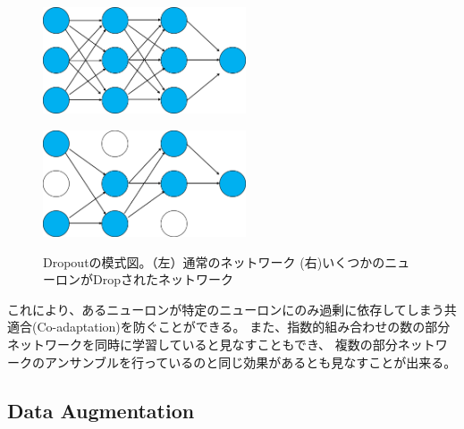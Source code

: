 
\begin{figure}[tbp]
    \begin{minipage}{0.5\hsize}
     \begin{center}
      \includegraphics[width=60mm]{figures/standard_network.png}
     \end{center}
     \label{fig:one}
    \end{minipage}
    \begin{minipage}{0.5\hsize}
     \begin{center}
      \includegraphics[width=60mm]{figures/dropout_network.png}
     \end{center}
     \label{fig:two}
    \end{minipage}
    \caption{\label{fig:dropout_network}Dropoutの模式図。（左）通常のネットワーク (右)いくつかのニューロンがDropされたネットワーク}
    
\end{figure}

これにより、あるニューロンが特定のニューロンにのみ過剰に依存してしまう共適合(Co-adaptation)を防ぐことができる。
また、指数的組み合わせの数の部分ネットワークを同時に学習していると見なすこともでき、
複数の部分ネットワークのアンサンブルを行っているのと同じ効果があるとも見なすことが出来る。

\subsection{Data Augmentation}

